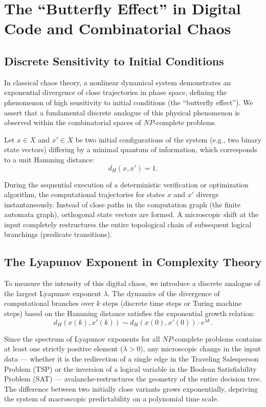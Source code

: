 \documentclass[12pt,a4paper]{article}
\begin{document}
\section{The ``Butterfly Effect'' in Digital Code and Combinatorial Chaos}

\subsection{Discrete Sensitivity to Initial Conditions}

In classical chaos theory, a nonlinear dynamical system demonstrates an exponential divergence of close trajectories in phase space, defining the phenomenon of high sensitivity to initial conditions (the ``butterfly effect''). We assert that a fundamental discrete analogue of this physical phenomenon is observed within the combinatorial spaces of $NP$-complete problems.

Let $x \in X$ and $x' \in X$ be two initial configurations of the system (e.g., two binary state vectors) differing by a minimal quantum of information, which corresponds to a unit Hamming distance:
\begin{equation}
d_H(x, x') = 1.
\end{equation}

During the sequential execution of a deterministic verification or optimization algorithm, the computational trajectories for states $x$ and $x'$ diverge instantaneously. Instead of close paths in the computation graph (the finite automata graph), orthogonal state vectors are formed. A microscopic shift at the input completely restructures the entire topological chain of subsequent logical branchings (predicate transitions).

\subsection{The Lyapunov Exponent in Complexity Theory}

To measure the intensity of this digital chaos, we introduce a discrete analogue of the largest Lyapunov exponent $\lambda$. The dynamics of the divergence of computational branches over $k$ steps (discrete time steps or Turing machine steps) based on the Hamming distance satisfies the exponential growth relation:
\begin{equation}
d_H(x(k), x'(k)) \sim d_H(x(0), x'(0)) \cdot e^{\lambda k}.
\end{equation}

Since the spectrum of Lyapunov exponents for all $NP$-complete problems contains at least one strictly positive element ($\lambda > 0$), any microscopic change in the input data — whether it is the redirection of a single edge in the Traveling Salesperson Problem (TSP) or the inversion of a logical variable in the Boolean Satisfiability Problem (SAT) — avalanche-restructures the geometry of the entire decision tree. The difference between two initially close variants grows exponentially, depriving the system of macroscopic predictability on a polynomial time scale.
\end{document}
